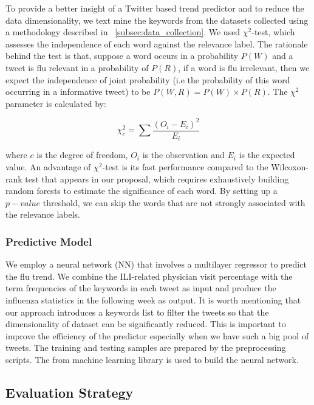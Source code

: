 \documentclass[12pt, oneside]{article}
\begin{document}
To provide a better insight of a Twitter based trend predictor and to reduce the data dimensionality, we text mine the keywords
from the datasets collected using a methodology described in ~\ref{subsec:data_collection}. We used  $\chi^2$-test, which assesses the independence
of each word against the relevance label. The rationale behind the test is that, suppose a word occurs in a probability $P(W)$
and a tweet is flu relevant in a probability of $P(R)$, if a word is flu irrelevant, then we expect the independence of joint probability
(i.e the probability of this word occurring in a informative tweet) to be $P(W, R) = P(W) \times P(R)$. The $\chi^2$ parameter is calculated by:

$$ \chi_c^2 = \sum{\frac{(O_i-E_i)^2}{E_i}}$$

where $c$ is the degree of freedom, $O_i$ is the observation and $E_i$ is the expected value.
An advantage of $\chi^2$-test is its fast performance compared to the Wilcoxon-rank test that appears in our proposal,
which requires exhaustively building random forests to estimate the significance of each word.
By setting up a $p-value$ threshold, we can skip the words that are not strongly associated with the relevance labels.

\subsubsection{Predictive Model}

We employ a neural network (NN) that involves a multilayer regressor to predict the flu trend.
We combine the ILI-related physician visit percentage with the term frequencies of the keywords in each tweet as input
and produce the influenza statistics in the following week as output.
It is worth mentioning that our approach introduces a keywords list to filter the tweets so that the dimensionality of dataset can be significantly reduced.
This is important to improve the efficiency of the predictor especially when we have such a big pool of tweets.
The training and testing samples are prepared by the preprocessing scripts.
The  from machine learning library  is used to build the neural network.

\subsection{Evaluation Strategy}
\label{subsec:evaluation}

\end{document}

